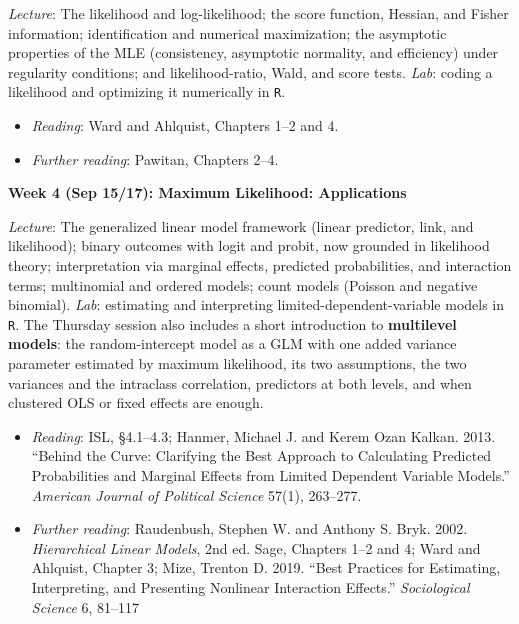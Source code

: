 \documentclass[12pt]{article}
\begin{document}
\noindent \textit{Lecture}: The likelihood and log-likelihood; the score function, Hessian, and Fisher information; identification and numerical maximization; the asymptotic properties of the MLE (consistency, asymptotic normality, and efficiency) under regularity conditions; and likelihood-ratio, Wald, and score tests. \textit{Lab}: coding a likelihood and optimizing it numerically in \texttt{R}.
\begin{itemize}[noitemsep, topsep=2pt]
    \item \textit{Reading}: Ward and Ahlquist, Chapters 1--2 and 4.
    \item \textit{Further reading}: Pawitan, Chapters 2--4.
\end{itemize}

\vspace{0.8em} \noindent \textbf{\textcolor{titlecolor}{Week 4 (Sep 15/17): Maximum Likelihood: Applications}}

\noindent \textit{Lecture}: The generalized linear model framework (linear predictor, link, and likelihood); binary outcomes with logit and probit, now grounded in likelihood theory; interpretation via marginal effects, predicted probabilities, and interaction terms; multinomial and ordered models; count models (Poisson and negative binomial). \textit{Lab}: estimating and interpreting limited-dependent-variable models in \texttt{R}. The Thursday session also includes a short introduction to \textbf{multilevel models}: the random-intercept model as a GLM with one added variance parameter estimated by maximum likelihood, its two assumptions, the two variances and the intraclass correlation, predictors at both levels, and when clustered OLS or fixed effects are enough.
\begin{itemize}[noitemsep, topsep=2pt]
    \item \textit{Reading}: ISL, \S 4.1--4.3; Hanmer, Michael J. and Kerem Ozan Kalkan. 2013. ``Behind the Curve: Clarifying the Best Approach to Calculating Predicted Probabilities and Marginal Effects from Limited Dependent Variable Models.'' \textit{American Journal of Political Science} 57(1), 263--277.
    \item \textit{Further reading}: Raudenbush, Stephen W. and Anthony S. Bryk. 2002. \textit{Hierarchical Linear Models}, 2nd ed. Sage, Chapters 1--2 and 4; Ward and Ahlquist, Chapter 3; Mize, Trenton D. 2019. ``Best Practices for Estimating, Interpreting, and Presenting Nonlinear Interaction Effects.'' \textit{Sociological Science} 6, 81--117
\end{itemize}
\end{document}
